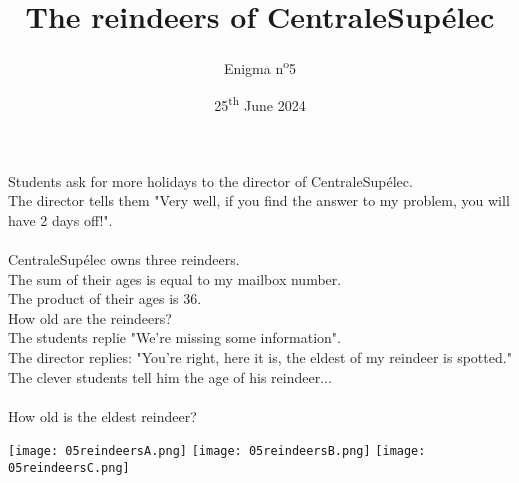 \documentclass[a4paper, top=10mm]{article}
\title{\textbf{\huge{The reindeers of CentraleSupélec}}}
\author{Enigma n\textsuperscript{o}5}
\date{25\textsuperscript{th} June 2024}
\begin{document}
	\maketitle
	
	\Large
	Students ask for more holidays to the director of CentraleSupélec.\\
	The director tells them "Very well, if you find the answer to my problem, you will have 2 days off!".\\
	\\
	CentraleSupélec owns three reindeers.\\
	The sum of their ages is equal to my mailbox number.\\
	The product of their ages is 36.\\
	How old are the reindeers?\\
	The students replie "We're missing some information".\\
	The director replies: "You’re right, here it is, the eldest of my reindeer is spotted."\\
	The clever students tell him the age of his reindeer...\\
	\\
	How old is the eldest reindeer?
	
	\vspace{1cm}
	
	\begin{center}
		\texttt{[image: 05reindeersA.png]}		\texttt{[image: 05reindeersB.png]}		\texttt{[image: 05reindeersC.png]}
	\end{center}
	
	
	
	
	
\end{document}
